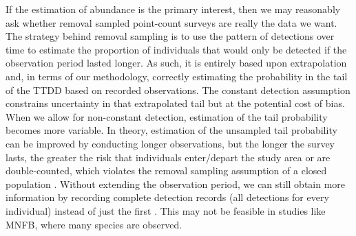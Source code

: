 \documentclass[useAMS,usenatbib,referee,12pt]{article}
\newif\ifdic   %
\newcommand{\adam}[1]{{\color{blue} ADAM: #1}}
\begin{document}
\ifdic
In a limited set of situations, posterior predictive checks and DIC can identify when non-mixture or exponential TTDDs inadequately describe the marginal pattern of detections over time.  
But in many situations, neither tool points a clear way to select the correct family of TTDD.  
\fi




If the estimation of abundance is the primary interest, then we may reasonably ask whether removal sampled point-count surveys are really the data we want.  
The strategy behind removal sampling is to use the pattern of detections over time to estimate the proportion of individuals that would only be detected if the observation period lasted longer.  
As such, it is entirely based upon extrapolation and, in terms of our methodology, correctly estimating the probability in the tail of the TTDD based on recorded observations.
The constant detection assumption constrains uncertainty in that extrapolated tail but at the potential cost of bias.
When we allow for non-constant detection, estimation of the tail probability becomes more variable.
In theory, estimation of the unsampled tail probability can be improved by conducting longer observations, but the longer the survey lasts, the greater the risk that individuals enter/depart the study area or are double-counted, which violates the removal sampling assumption of a closed population \citep{LeeMarsden2008, Reidy2011}.  
Without extending the observation period, we can still obtain more information by recording complete detection records (all detections for every individual) instead of just the first \citep{Alldredge2007}.  
This may not be feasible in studies like MNFB, where many species are observed.  

\end{document}
